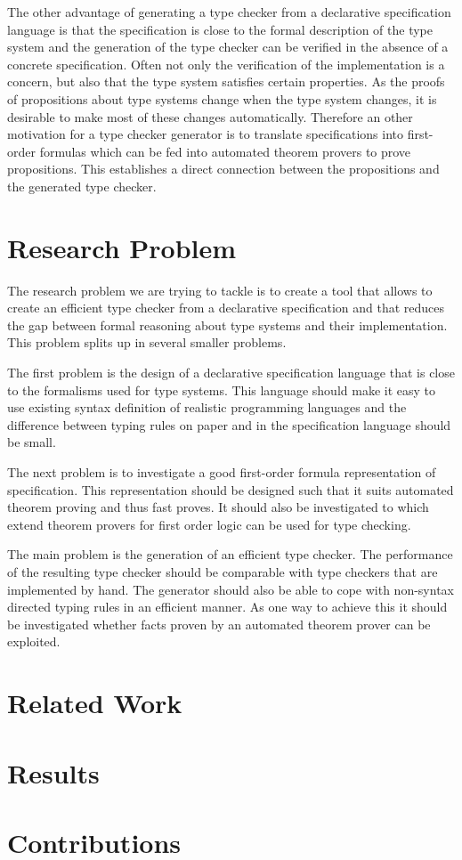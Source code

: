\documentclass{acm_proc_article-sp}
\begin{document}
The other advantage of generating a type checker from a declarative
specification language is that the specification is close to the
formal description of the type system and the generation of the type
checker can be verified in the absence of a concrete
specification. Often not only the verification of the implementation
is a concern, but also that the type system satisfies certain
properties. As the proofs of propositions about type systems change
when the type system changes, it is desirable to make most of these
changes automatically. Therefore an other motivation for a type
checker generator is to translate specifications into first-order
formulas which can be fed into automated theorem provers to prove
propositions. This establishes a direct connection between the
propositions and the generated type checker.


\section{Research Problem}
The research problem we are trying to tackle is to create a tool that
allows to create an efficient type checker from a declarative
specification and that reduces the gap between formal reasoning about
type systems and their implementation. This problem splits up in
several smaller problems.

The first problem is the design of a declarative specification
language that is close to the formalisms used for type systems. This
language should make it easy to use existing syntax definition of
realistic programming languages and the difference between typing
rules on paper and in the specification language should be small.

The next problem is to investigate a good first-order formula
representation of specification. This representation should be
designed such that it suits automated theorem proving and thus fast
proves. It should also be investigated to which extend theorem provers
for first order logic can be used for type checking.

The main problem is the generation of an efficient type checker. The
performance of the resulting type checker should be comparable with
type checkers that are implemented by hand. The generator should also
be able to cope with non-syntax directed typing rules in an efficient
manner. As one way to achieve this it should be investigated whether
facts proven by an automated theorem prover can be exploited.
\section{Related Work}
\section{Results}
\section{Contributions}
\end{document}
